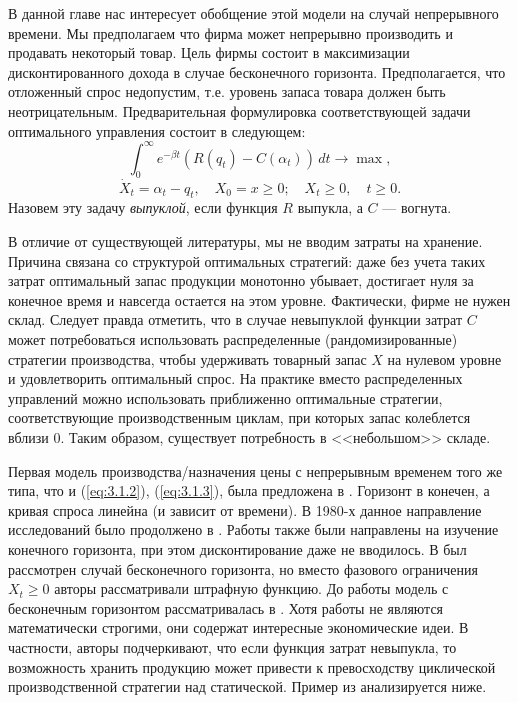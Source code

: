 В данной главе нас интересует обобщение этой модели на случай непрерывного времени. Мы предполагаем что фирма может непрерывно производить и продавать некоторый товар. Цель фирмы состоит в максимизации дисконтированного дохода в случае бесконечного горизонта. Предполагается, что отложенный спрос недопустим, т.е. уровень запаса товара должен быть неотрицательным. Предварительная формулировка соответствующей задачи оптимального управления состоит в следующем:
\begin{equation} \label{eq:3.1.2}
\int_0^\infty e^{-\beta t} (R(q_t)-C(\alpha_t))\,dt\to\max,
\end{equation}
\begin{equation} \label{eq:3.1.3}
 \dot X_t=\alpha_t-q_t,\quad X_0=x\ge 0;\quad X_t\ge 0,\quad t\ge 0.
\end{equation}
Назовем эту задачу \emph{выпуклой}, если функция $R$ выпукла, а $C$ --- вогнута.

В отличие от существующей литературы, мы не вводим затраты на хранение. Причина связана со структурой оптимальных стратегий: даже без учета таких затрат оптимальный запас продукции монотонно убывает, достигает нуля за конечное время и навсегда остается на этом уровне. Фактически, фирме не нужен склад. Следует правда отметить, что в случае невыпуклой функции затрат $C$ может потребоваться использовать распределенные (рандомизированные) стратегии производства, чтобы  удерживать товарный запас $X$ на нулевом уровне и удовлетворить оптимальный спрос. На практике вместо распределенных управлений можно использовать приближенно оптимальные стратегии, соответствующие производственным циклам, при которых запас колеблется вблизи $0$. Таким образом, существует потребность в <<небольшом>> складе.

Первая модель производства/назначения цены с непрерывным временем того же типа, что и (\ref{eq:3.1.2}), (\ref{eq:3.1.3}), была предложена в \cite{Pek74}. Горизонт в \cite{Pek74} конечен, а кривая спроса линейна (и зависит от времени). В 1980-х данное направление исследований было продолжено в \cite{ThoSetTen84,FeiHar85,EliSte87}. Работы \cite{ThoSetTen84,EliSte87} также были направлены на изучение конечного горизонта, при этом дисконтирование даже не вводилось. В \cite{FeiHar85} был рассмотрен случай бесконечного горизонта, но вместо фазового ограничения $X_t\ge 0$ авторы рассматривали штрафную функцию. До работы \cite{FeiHar85} модель с бесконечным горизонтом рассматривалась в \cite{ArvMos81,ArvMos82}. Хотя работы \cite{ArvMos81,ArvMos82} не являются математически строгими, они содержат интересные экономические идеи. В частности, авторы подчеркивают, что если функция затрат невыпукла, то возможность хранить продукцию может привести к превосходству циклической производственной стратегии над статической. Пример из \cite{ArvMos82} анализируется ниже.

